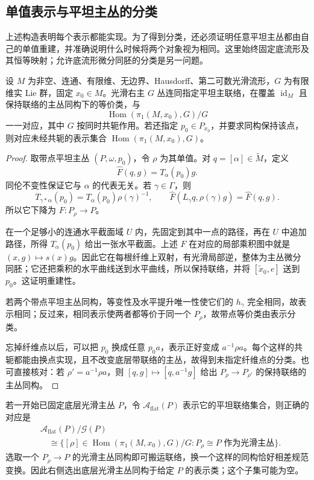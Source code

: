 \subsection{单值表示与平坦主丛的分类}
\label{g1:subsec:1804:04}

上述构造表明每个表示都能实现。为了得到分类，还必须证明任意平坦主丛都由自己的单值重建，并准确说明什么时候将两个对象视为相同。这里始终固定底流形及其恒等映射；允许底流形微分同胚的分类是另一问题。

\begin{theorem}\label{g1:thm:flat-principal-classification}
	设 \(M\) 为非空、连通、有限维、无边界、Hausdorff、第二可数光滑流形，\(G\) 为有限维实 Lie 群，固定 \(x_0\in M\)。光滑右主 \(G\) 丛连同指定平坦主联络，在覆盖 \(\operatorname{id}_M\) 且保持联络的主丛同构下的等价类，与
	\[
		\operatorname{Hom}(\pi_1(M,x_0),G)/G
	\]
	一一对应，其中 \(G\) 按同时共轭作用。若还指定 \(p_0\in P_{x_0}\)，并要求同构保持该点，则对应未经共轭的表示集合 \(\operatorname{Hom}(\pi_1(M,x_0),G)\)。
\end{theorem}
\begin{proof}
	取带点平坦主丛 \((P,\omega,p_0)\)，令 \(\rho\) 为其单值。对 \(q=[\alpha]\in\widetilde M\)，定义
	\[
		\widehat F(q,g)=T_\alpha(p_0)g.
	\]
	同伦不变性保证它与 \(\alpha\) 的代表无关。若 \(\gamma\in\Gamma\)，则
	\[
		T_{\gamma*\alpha}(p_0)=T_\alpha(p_0)\rho(\gamma)^{-1},
		\qquad \widehat F(L_\gamma q,\rho(\gamma)g)=\widehat F(q,g).
	\]
	所以它下降为 \(F:P_\rho\to P\)。

	在一个足够小的连通水平截面域 \(U\) 内，先固定到其中一点的路径，再在 \(U\) 中追加路径，所得 \(T_\alpha(p_0)\) 给出一张水平截面。上述 \(F\) 在对应的局部乘积图中就是 \((x,g)\mapsto s(x)g\)。因此它在每根纤维上双射，有光滑局部逆，整体为主丛微分同胚；它还把乘积的水平曲线送到水平曲线，所以保持联络，并将 \([\widetilde x_0,e]\) 送到 \(p_0\)。这证明重建性。

	若两个带点平坦主丛同构，等变性及水平提升唯一性使它们的 \(h_\gamma\) 完全相同，故表示相同；反过来，相同表示使两者都等价于同一个 \(P_\rho\)，故带点等价类由表示分类。

	忘掉纤维点以后，可以把 \(p_0\) 换成任意 \(p_0a\)，表示正好变成 \(a^{-1}\rho a\)。每个这样的共轭都能由换点实现，且不改变底层带联络的主丛，故得到未指定纤维点的分类。也可直接核对：若 \(\rho'=a^{-1}\rho a\)，则 \([q,g]\mapsto[q,a^{-1}g]\) 给出 \(P_\rho\to P_{\rho'}\) 的保持联络的主丛同构。
\end{proof}

若一开始已固定底层光滑主丛 \(P\)，令 \(\mathcal A_{\mathrm{flat}}(P)\) 表示它的平坦联络集合，则正确的对应是
\begin{equation}\label{g1:eq:fixed-bundle-flat-moduli}
	\begin{split}
		&\mathcal A_{\mathrm{flat}}(P)/\mathcal G(P)\\
		&\quad\cong\{[\rho]\in\operatorname{Hom}(\pi_1(M,x_0),G)/G:
		P_\rho\cong P\text{ 作为光滑主丛}\}.
	\end{split}
\end{equation}
选取一个 \(P_\rho\to P\) 的光滑主丛同构即可搬运联络，换一个这样的同构恰好相差规范变换。因此右侧选出底层光滑主丛同构于给定 \(P\) 的表示类；这个子集可能为空。


